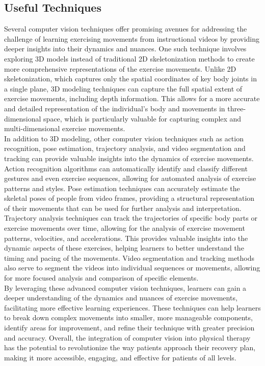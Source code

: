 \subsection{Useful Techniques}
\indent Several computer vision techniques offer promising avenues for addressing the challenge of learning 
exercising movements from instructional videos by providing deeper insights into their dynamics and nuances. 
One such technique involves exploring 3D models instead of traditional 2D skeletonization
 methods to create more comprehensive representations of the exercise movements. Unlike 2D skeletonization, 
 which captures only the spatial coordinates of key body joints in a single plane, 3D modeling 
 techniques can capture the full spatial extent of exercise movements, including depth information\cite{Alpher03}. This 
 allows for a more accurate and detailed representation of the individual's body and movements in 
 three-dimensional space, which is particularly valuable for capturing complex and multi-dimensional 
 exercise movements\cite{Authors14b}.
\\
\indent In addition to 3D modeling, other computer vision techniques such as action recognition, pose 
estimation, trajectory analysis, and video segmentation and tracking can provide valuable insights 
into the dynamics of exercise movements. Action recognition algorithms can automatically identify and 
classify different gestures and even exercise sequences, allowing for automated analysis of exercise 
patterns and styles. Pose estimation techniques can accurately estimate the skeletal poses of 
people from video frames, providing a structural representation of their movements that can be 
used for further analysis and interpretation.
\\
\indent Trajectory analysis techniques can track the trajectories of specific body parts or exercise movements 
over time, allowing for the analysis of exercise movement patterns, velocities, and accelerations\cite{Alpher02}. This 
provides valuable insights into the dynamic aspects of these exercises, 
helping learners to better understand the timing and pacing of the movements. Video segmentation and 
tracking methods also serve to segment the videos into individual sequences or movements, allowing for more 
focused analysis and comparison of specific elements.
\\
\indent By leveraging these advanced computer vision techniques, learners can gain a deeper understanding 
of the dynamics and nuances of exercise movements, facilitating more effective learning experiences. 
These techniques can help learners to break down complex movements into smaller, more 
manageable components, identify areas for improvement, and refine their technique with greater 
precision and accuracy. Overall, the integration of computer vision into physical therapy has the 
potential to revolutionize the way patients approach their recovery plan, making it more accessible, engaging, 
and effective for patients of all levels.

